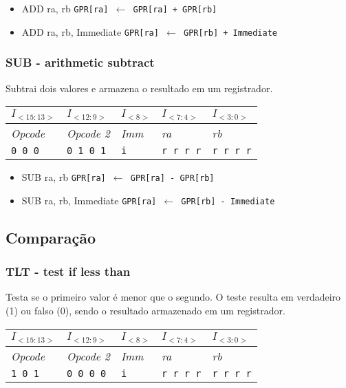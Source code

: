 \documentclass[11pt,a4paper]{report}
\begin{document}
\begin{itemize}
\item ADD ra, rb
\subitem \texttt{GPR[ra] $\leftarrow$ GPR[ra] + GPR[rb]}
\item ADD ra, rb, Immediate
\subitem \texttt{GPR[ra] $\leftarrow$ GPR[rb] + Immediate}
\end{itemize}

\subsubsection{SUB - arithmetic subtract}
Subtrai dois valores e armazena o resultado em um registrador.

\begin{table}[htb!]
\centering
\begin{tabular}{|p{2cm}|p{2cm}|p{2cm}|p{2cm}|p{2cm}|}
\hline
$I_{<15:13>}$ & $I_{<12:9>}$ & $I_{<8>}$ & $I_{<7:4>}$ & $I_{<3:0>}$  \\ \hline
\textit{Opcode} & \textit{Opcode 2} & \textit{Imm} & \textit{ra} & \textit{rb} \\ \hline
\texttt{0 0 0} & \texttt{0 1 0 1} & \texttt{i} & \texttt{r r r r} & \texttt{r r r r} \\ \hline
\end{tabular}
\end{table}

\begin{itemize}
\item SUB ra, rb
\subitem \texttt{GPR[ra] $\leftarrow$ GPR[ra] - GPR[rb]}
\item SUB ra, rb, Immediate
\subitem \texttt{GPR[ra] $\leftarrow$ GPR[rb] - Immediate}
\end{itemize}


\subsection{Comparação}

\subsubsection{TLT - test if less than}
Testa se o primeiro valor é menor que o segundo. O teste resulta em
verdadeiro (1) ou falso (0), sendo o resultado armazenado em um
registrador.

\begin{table}[htb!]
\centering
\begin{tabular}{|p{2cm}|p{2cm}|p{2cm}|p{2cm}|p{2cm}|}
\hline
$I_{<15:13>}$ & $I_{<12:9>}$ & $I_{<8>}$ & $I_{<7:4>}$ & $I_{<3:0>}$  \\ \hline
\textit{Opcode} & \textit{Opcode 2} & \textit{Imm} & \textit{ra} & \textit{rb} \\ \hline
\texttt{1 0 1} & \texttt{0 0 0 0} & \texttt{i} & \texttt{r r r r} & \texttt{r r r r} \\ \hline
\end{tabular}
\end{table}
\end{document}
